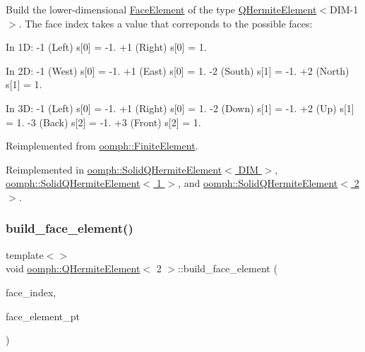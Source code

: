 Build the lower-\/dimensional \hyperlink{classoomph_1_1FaceElement}{Face\+Element} of the type \hyperlink{classoomph_1_1QHermiteElement}{Q\+Hermite\+Element}$<$D\+I\+M-\/1$>$. The face index takes a value that correponds to the possible faces\+: 

In 1D\+: -\/1 (Left) s\mbox{[}0\mbox{]} = -\/1. +1 (Right) s\mbox{[}0\mbox{]} = 1.

In 2D\+: -\/1 (West) s\mbox{[}0\mbox{]} = -\/1. +1 (East) s\mbox{[}0\mbox{]} = 1. -\/2 (South) s\mbox{[}1\mbox{]} = -\/1. +2 (North) s\mbox{[}1\mbox{]} = 1.

In 3D\+: -\/1 (Left) s\mbox{[}0\mbox{]} = -\/1. +1 (Right) s\mbox{[}0\mbox{]} = 1. -\/2 (Down) s\mbox{[}1\mbox{]} = -\/1. +2 (Up) s\mbox{[}1\mbox{]} = 1. -\/3 (Back) s\mbox{[}2\mbox{]} = -\/1. +3 (Front) s\mbox{[}2\mbox{]} = 1. 

Reimplemented from \hyperlink{classoomph_1_1FiniteElement_aaf7bead5b462cfd5401d97b3dbdc7af7}{oomph\+::\+Finite\+Element}.



Reimplemented in \hyperlink{classoomph_1_1SolidQHermiteElement_a4e81780865998f59277d7424217ec7c1}{oomph\+::\+Solid\+Q\+Hermite\+Element$<$ D\+I\+M $>$}, \hyperlink{classoomph_1_1SolidQHermiteElement_a4e81780865998f59277d7424217ec7c1}{oomph\+::\+Solid\+Q\+Hermite\+Element$<$ 1 $>$}, and \hyperlink{classoomph_1_1SolidQHermiteElement_a4e81780865998f59277d7424217ec7c1}{oomph\+::\+Solid\+Q\+Hermite\+Element$<$ 2 $>$}.

\mbox{\label{classoomph_1_1QHermiteElement_a7e81604ac70e3adf1b82496fdbbc4348}} 
\subsubsection{\texorpdfstring{build\+\_\+face\+\_\+element()}{build\_face\_element()}\hspace{0.1cm}{\footnotesize\ttfamily [3/3]}}
{\footnotesize\ttfamily template$<$$>$ \\
void \hyperlink{classoomph_1_1QHermiteElement}{oomph\+::\+Q\+Hermite\+Element}$<$ 2 $>$\+::build\+\_\+face\+\_\+element (\begin{DoxyParamCaption}\item[{const int \&}]{face\+\_\+index,  }\item[{\hyperlink{classoomph_1_1FaceElement}{Face\+Element} $\ast$}]{face\+\_\+element\+\_\+pt }\end{DoxyParamCaption})\hspace{0.3cm}{\ttfamily [virtual]}}

